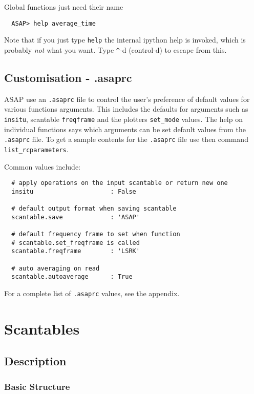 \documentclass[11pt]{article}
\newcommand{\cmd}[1]{{\tt #1}}
\begin{document}
Global functions just need their name

\begin{verbatim}
  ASAP> help average_time
\end{verbatim}

Note that if you just type \cmd{help} the internal ipython help is
invoked, which is probably {\em not} what you want. Type \verb+^+-d
(control-d) to escape from this.

\subsection{Customisation - .asaprc}

ASAP use an \cmd{.asaprc} file to control the user's preference of
default values for various functions arguments. This includes the
defaults for arguments such as \cmd{insitu}, scantable \cmd{freqframe}
and the plotters \cmd{set\_mode} values. The help on individual
functions says which arguments can be set default values from the
\cmd{.asaprc} file. To get a sample contents for the \cmd{.asaprc}
file use then command \cmd{list\_rcparameters}.

Common values include:
\begin{verbatim}
  # apply operations on the input scantable or return new one
  insitu                     : False

  # default output format when saving scantable
  scantable.save             : 'ASAP'

  # default frequency frame to set when function
  # scantable.set_freqframe is called
  scantable.freqframe        : 'LSRK'

  # auto averaging on read
  scantable.autoaverage      : True
\end{verbatim}

For a complete list of \cmd{.asaprc} values, see the appendix.

\section{Scantables}

\subsection {Description}

\subsubsection {Basic Structure}
\end{document}
